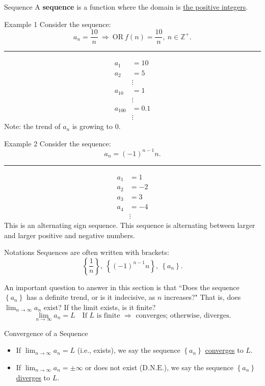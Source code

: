 \documentclass[12pt,a4paper]{article}
\def\Z{{\mathbb{Z}}}
\def\DNE{\mathrm{D.N.E.}}
\begin{document}
\begin{df}{Sequence}
	A \textbf{sequence} is a function where the domain is \underline{the positive integers}.	
\end{df}
\begin{eg}{Example 1}
	Consider the sequence: $$a_n=\frac{10}{n}\ \Rightarrow\ \text{OR}\ f(n)=\frac{10}{n},\ n\in\Z^+.$$	
	\noindent\rule[0.25\baselineskip]{\textwidth}{1pt}
	$$\begin{aligned}
		a_1&=10\\
		a_2&=5\\
		&\vdots\\
		a_{10}&=1\\
		&\vdots\\
		a_{100}&=0.1\\
		&\vdots
	\end{aligned}$$
	Note: the trend of $a_n$ is growing to $0$.
\end{eg}
\begin{eg}{Example 2}
	Consider the sequence: $$a_n=(-1)^{n-1}n.$$	
	\noindent\rule[0.25\baselineskip]{\textwidth}{1pt}
	$$\begin{aligned}
		a_1&=1\\
		a_2&=-2\\
		a_3&=3\\
		a_{4}&=-4\\
		&\vdots
	\end{aligned}$$
	This is an alternating sign sequence. This sequence is alternating between larger and larger positive and negative numbers. 
\end{eg}
\begin{rmk}{Notations}
	Sequences are often written with brackets: 
	$$\left\{\frac{1}{n}\right\},\ \left\{(-1)^{n-1}n\right\},\ \left\{a_n\right\}.$$
\end{rmk}
An important question to answer in this section is that ``Does the sequence $\left\{a_n\right\}$ has a definite trend, or is it indecisive, as $n$ increases?" That is, does $\displaystyle\lim_{n\to\infty}a_n$ exist? If the limit exists, is it finite? 
$$\lim_{n\to\infty}a_n=L\quad\text{If }L\text{ is finite }\Rightarrow\text{ converges; otherwise, diverges.}$$
\begin{df}{Convergence of a Sequence}
	\begin{itemize}
	\item If $\displaystyle\lim_{n\to\infty}a_n=L$ (i.e., exists), we say the sequence $\left\{a_n\right\}$	\underline{converges} to $L$. 
	\item If $\displaystyle\lim_{n\to\infty}a_n=\pm\infty$ or does not exist ($\DNE$), we say the sequence $\left\{a_n\right\}$	\underline{diverges} to $L$. 
	\end{itemize}
\end{df}
\end{document}
